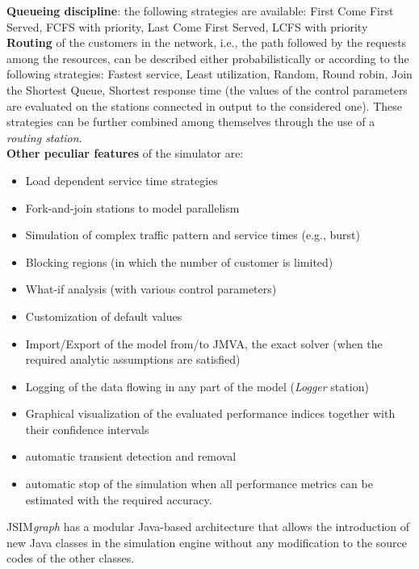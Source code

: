\noindent \textbf{Queueing discipline}: the following strategies
are available:  First Come First Served, FCFS with priority, Last
Come First Served, LCFS with priority\\

\noindent \textbf{Routing} of the customers in the network, i.e.,
the path followed by the requests among the resources, can be
described either probabilistically or according to the following
strategies: Fastest service, Least utilization, Random, Round
robin, Join the Shortest Queue, Shortest response time (the values
of the control parameters are evaluated on the stations connected
in output to the considered one). These strategies can be further
combined among themselves through the use of a \emph{routing
station}.\\

\noindent \textbf{Other peculiar features} of the simulator are:
\vspace{-0.2cm}
\begin{itemize}
    \item Load dependent service time strategies
    \item Fork-and-join stations to model parallelism
    \item Simulation of complex traffic pattern and service times (e.g., burst)
    \item Blocking regions (in which the number of customer is limited)
    \item What-if analysis (with various control parameters)
    \item Customization of default values
    \item Import/Export of the model from/to JMVA, the exact solver (when
    the required analytic assumptions are satisfied)
    \item Logging of the data flowing in any part of the model
    (\emph{Logger} station)
    \item Graphical visualization of the evaluated performance
    indices together with their confidence intervals
    \item automatic transient detection and removal
    \item automatic stop of the simulation when all performance
    metrics can be estimated with the required accuracy.
\end{itemize}
JSIM\emph{graph} has a modular Java-based architecture that allows
the introduction of new Java classes in the simulation engine
without any modification to the source codes of the other classes.

